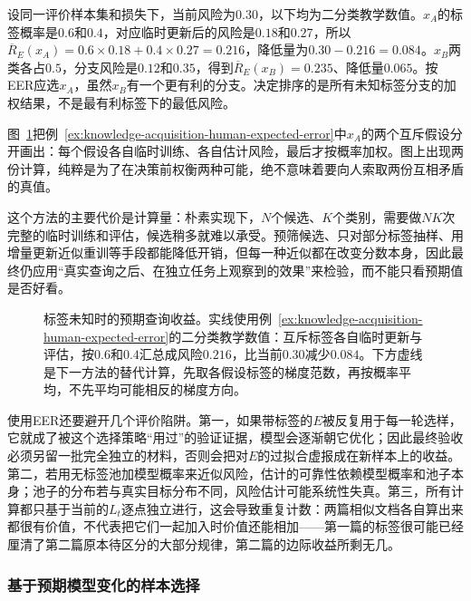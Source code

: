 \begin{example}[可复算的预期误差降低]
  \label{ex:knowledge-acquisition-human-expected-error}
  设同一评价样本集和损失下，当前风险为$0.30$，以下均为二分类教学数值。$x_A$的标签概率是$0.6$和$0.4$，对应临时更新后的风险是$0.18$和$0.27$，所以$\overline R_E(x_A)=0.6\times0.18+0.4\times0.27=0.216$，降低量为$0.30-0.216=0.084$。$x_B$两类各占$0.5$，分支风险是$0.12$和$0.35$，得到$\overline R_E(x_B)=0.235$、降低量$0.065$。按EER应选$x_A$，虽然$x_B$有一个更有利的分支。决定排序的是所有未知标签分支的加权结果，不是最有利标签下的最低风险。
\end{example}

图~\ref{fig:knowledge-acquisition-human-expected-utility}把例~\ref{ex:knowledge-acquisition-human-expected-error}中$x_A$的两个互斥假设分开画出：每个假设各自临时训练、各自估计风险，最后才按概率加权。图上出现两份计算，纯粹是为了在决策前权衡两种可能，绝不意味着要向人索取两份互相矛盾的真值。

这个方法的主要代价是计算量：朴素实现下，$N$个候选、$K$个类别，需要做$NK$次完整的临时训练和评估，候选稍多就难以承受。预筛候选、只对部分标签抽样、用增量更新近似重训等手段都能降低开销，但每一种近似都在改变分数本身，因此最终仍应用“真实查询之后、在独立任务上观察到的效果”来检验，而不能只看预期值是否好看。

\begin{figure}[htbp]
  \centering
  
  \caption{标签未知时的预期查询收益。实线使用例~\ref{ex:knowledge-acquisition-human-expected-error}的二分类教学数值：互斥标签各自临时更新与评估，按$0.6$和$0.4$汇总成风险$0.216$，比当前$0.30$减少$0.084$。下方虚线是下一方法的替代计算，先取各假设标签的梯度范数，再按概率平均，不先平均可能相反的梯度方向。}
  \label{fig:knowledge-acquisition-human-expected-utility}
\end{figure}

使用EER还要避开几个评价陷阱。第一，如果带标签的$E$被反复用于每一轮选样，它就成了被这个选择策略“用过”的验证证据，模型会逐渐朝它优化；因此最终验收必须另留一批完全独立的材料，否则会把对$E$的过拟合虚报成在新样本上的收益。第二，若用无标签池加模型概率来近似风险，估计的可靠性依赖模型概率和池子本身；池子的分布若与真实目标分布不同，风险估计可能系统性失真。第三，所有计算都只基于当前的$L_t$逐点独立进行，这会导致重复计数：两篇相似文档各自算出来都很有价值，不代表把它们一起加入时价值还能相加——第一篇的标签很可能已经厘清了第二篇原本待区分的大部分规律，第二篇的边际收益所剩无几。

\subsubsection{基于预期模型变化的样本选择}
\label{sec:knowledge-acquisition-human-expected-model-change}

